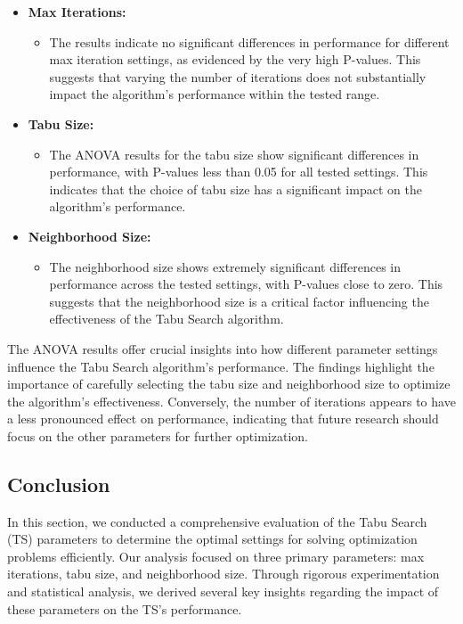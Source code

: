 \documentclass{article}
\begin{document}
    \begin{itemize}
        \item \textbf{Max Iterations:}
        \begin{itemize}
            \item The results indicate no significant differences in performance for different max iteration settings, as evidenced by the very high P-values. This suggests that varying the number of iterations does not substantially impact the algorithm's performance within the tested range.
        \end{itemize}
        \item \textbf{Tabu Size:}
        \begin{itemize}
            \item The ANOVA results for the tabu size show significant differences in performance, with P-values less than 0.05 for all tested settings. This indicates that the choice of tabu size has a significant impact on the algorithm's performance.
        \end{itemize}
        \item \textbf{Neighborhood Size:}
        \begin{itemize}
            \item The neighborhood size shows extremely significant differences in performance across the tested settings, with P-values close to zero. This suggests that the neighborhood size is a critical factor influencing the effectiveness of the Tabu Search algorithm.
        \end{itemize}
    \end{itemize}

    The ANOVA results offer crucial insights into how different parameter settings influence the Tabu Search algorithm's performance. The findings highlight the importance of carefully selecting the tabu size and neighborhood size to optimize the algorithm's effectiveness. Conversely, the number of iterations appears to have a less pronounced effect on performance, indicating that future research should focus on the other parameters for further optimization.

    \subsection{Conclusion}

    In this section, we conducted a comprehensive evaluation of the Tabu Search (TS) parameters to determine the optimal settings for solving optimization problems efficiently. Our analysis focused on three primary parameters: max iterations, tabu size, and neighborhood size. Through rigorous experimentation and statistical analysis, we derived several key insights regarding the impact of these parameters on the TS’s performance.
\end{document}
